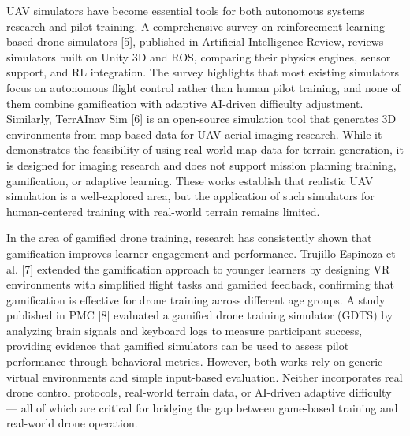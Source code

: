 UAV simulators have become essential tools for both autonomous systems research and pilot training. A comprehensive survey on reinforcement learning-based drone simulators [5], published in Artificial Intelligence Review, reviews simulators built on Unity 3D and ROS, comparing their physics engines, sensor support, and RL integration. The survey highlights that most existing simulators focus on autonomous flight control rather than human pilot training, and none of them combine gamification with adaptive AI-driven difficulty adjustment. Similarly, TerrAInav Sim [6] is an open-source simulation tool that generates 3D environments from map-based data for UAV aerial imaging research. While it demonstrates the feasibility of using real-world map data for terrain generation, it is designed for imaging research and does not support mission planning training, gamification, or adaptive learning. These works establish that realistic UAV simulation is a well-explored area, but the application of such simulators for human-centered training with real-world terrain remains limited.

In the area of gamified drone training, research has consistently shown that gamification improves learner engagement and performance. Trujillo-Espinoza et al. [7] extended the gamification approach to younger learners by designing VR environments with simplified flight tasks and gamified feedback, confirming that gamification is effective for drone training across different age groups. A study published in PMC [8] evaluated a gamified drone training simulator (GDTS) by analyzing brain signals and keyboard logs to measure participant success, providing evidence that gamified simulators can be used to assess pilot performance through behavioral metrics. However, both works rely on generic virtual environments and simple input-based evaluation. Neither incorporates real drone control protocols, real-world terrain data, or AI-driven adaptive difficulty — all of which are critical for bridging the gap between game-based training and real-world drone operation.

